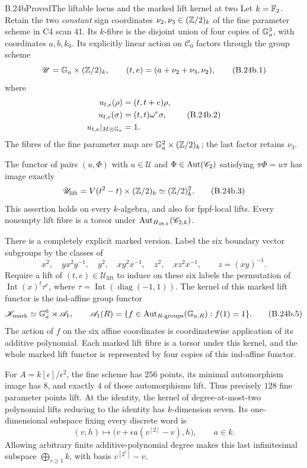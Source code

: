 \begin{statement}{B.24b}{Proved}{The liftable locus and the marked lift kernel at two}
Let $k=\mathbb F_2$.  Retain the two \emph{constant} sign coordinates
$\nu_2,\nu_3\in(\mathbb Z/2)_k$ of the fine parameter scheme in C4 scan 41.
Its $k$-fibre is the disjoint union of four copies of $\mathbb G_a^3$, with
coordinates $a,b,k_0$.  Its explicitly linear action on $\mathscr C_0$
factors through the group scheme
\[
 \mathscr U=\mathbb G_a\times(\mathbb Z/2)_k,\qquad
 (t,e)=(a+\nu_2+\nu_3,\nu_2),
 \tag{B.24b.1}
\]
where
\[
\begin{split}
 u_{t,e}(\rho)&=(t,t+e)\rho,\\
 u_{t,e}(\sigma)&=(t,t)\omega^e\sigma,\\
 u_{t,e}|_{M\otimes\mathbb G_a}&=1.
\end{split}
\tag{B.24b.2}
\]
The fibres of the fine parameter map are
$\mathbb G_a^2\times(\mathbb Z/2)_k$; the last factor retains $\nu_3$.

The functor of pairs $(u,\Phi)$ with $u\in\mathscr U$ and
$\Phi\in\operatorname{Aut}(\mathscr C_2)$ satisfying
$\pi\Phi=u\pi$ has image exactly
\[
       \mathscr U_{\mathrm{lift}}
       =V(t^2-t)\times(\mathbb Z/2)_k\simeq(\mathbb Z/2)_k^2.
 \tag{B.24b.3}
\]
This assertion holds on every $k$-algebra, and also for fppf-local lifts.
Every nonempty lift fibre is a torsor under
$\operatorname{Aut}_{H_{48,k}}(\mathscr C_{2,k})$.

There is a completely explicit marked version.  Label the six boundary
vector subgroups by the classes of
\[
 x^2,\quad yx^2y^{-1},\quad y^2,\quad xy^2x^{-1},
 \quad z^2,\quad xz^2x^{-1},\qquad z=(xy)^{-1}.
 \tag{B.24b.4}
\]
Require a lift of $(t,e)\in\mathscr U_{\mathrm{lift}}$ to induce on
these six labels the permutation of
$\operatorname{Int}(x)^t\tau^e$, where
$\tau=\operatorname{Int}(\operatorname{diag}(-1,1))$.
The kernel of this marked lift functor is the ind-affine group functor
\[
 \mathscr K_{\mathrm{mark}}\simeq\mathbb G_a^6\rtimes\mathscr A_1,
 \qquad
 \mathscr A_1(R)=
 \{f\in\operatorname{Aut}_{R\text{-groups}}(\mathbb G_{a,R}):f(1)=1\}.
 \tag{B.24b.5}
\]
The action of $f$ on the six affine coordinates is coordinatewise
application of its additive polynomial.  Each marked lift fibre is a
torsor under this kernel, and the whole marked lift functor is
represented by four copies of this ind-affine functor.

For $A=k[\epsilon]/\epsilon^2$, the fine scheme has $256$ points,
its minimal automorphism image has $8$, and exactly $4$ of those
automorphisms lift.  Thus precisely $128$ fine parameter points lift.
At the identity, the kernel of degree-at-most-two polynomial lifts
reducing to the identity has $k$-dimension seven.  Its one-dimensional
subspace fixing every discrete word is
\[
        (v,h)\longmapsto
           \bigl(v+\epsilon a(v^{[2]}-v),h\bigr),\qquad a\in k.
 \tag{B.24b.6}
\]
Allowing arbitrary finite additive-polynomial degree makes this last
infinitesimal subspace $\bigoplus_{r\ge1}k$, with basis
$v^{[2^r]}-v$.
\end{statement}
